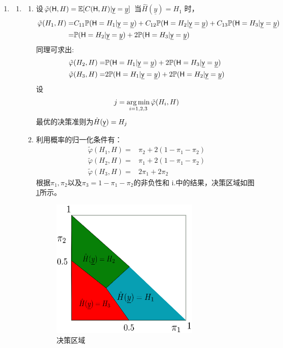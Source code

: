 \documentclass[a4paper]{article}
\begin{document}
\begin{enumerate}[label=\thehwcnt.\arabic*.]
\begin{enumerate}[label=(\alph*)]
    \end{enumerate}
  \item 
  \begin{enumerate}[label=(\alph*)]
  \item
    \begin{enumerate}[label=\roman*.]
    \item 设$\tilde{\varphi}(\mathsf{H},H)=\operatorname{\mathbb{E}}[C(\mathsf{H},H)|\underline{\mathsf{y}}=\underline{y}]$
    当$\hat{H}(\underline{y})=H_1$ 时，
    \begin{align*}
    \tilde{\varphi}(H_1,H) =& C_{11}\mathbb{P}(\mathsf{H}=H_1 | \underline{\mathsf{y}}=\underline{y})+
    C_{12}\mathbb{P}(\mathsf{H}=H_2 | \underline{\mathsf{y}}=\underline{y})+C_{13}\mathbb{P}(\mathsf{H}=H_3 | \underline{\mathsf{y}}=\underline{y})\\
    =& \mathbb{P}(\mathsf{H}=H_2 | \underline{\mathsf{y}}=\underline{y})+2\mathbb{P}(\mathsf{H}=H_3 | \underline{\mathsf{y}}=\underline{y})
    \end{align*}
    同理可求出:
    \begin{align*}
    \tilde{\varphi}(H_2,H) =&\mathbb{P}(\mathsf{H}=H_1 | \underline{\mathsf{y}}=\underline{y})+2\mathbb{P}(\mathsf{H}=H_3 | \underline{\mathsf{y}}=\underline{y})\\
    \tilde{\varphi}(H_3,H) =&2\mathbb{P}(\mathsf{H}=H_1 | \underline{\mathsf{y}}=\underline{y})+2\mathbb{P}(\mathsf{H}=H_2 | \underline{\mathsf{y}}=\underline{y})
    \end{align*}
    设
    \[    
    j=\operatorname*{arg\,min}_{i=1,2,3} \tilde{\varphi}(H_i,H)
    \]
    最优的决策准则为$\hat{H}(\underline{\mathsf{y}})=H_j$
    \item
    利用概率的归一化条件有：
    \begin{align*}
    \tilde{\varphi}(H_1,H) =&\pi_2+2(1-\pi_1-\pi_2)\\    
    \tilde{\varphi}(H_2,H) =&\pi_1+2(1-\pi_1-\pi_2)\\    
    \tilde{\varphi}(H_3,H) =&2\pi_1+2\pi_2
    \end{align*}
    根据$\pi_1,\pi_2$以及$\pi_3=1-\pi_1-\pi_2$的非负性和
    i.中的结果，决策区域如图\ref{fig:c3f1}所示。
    \begin{figure}[!ht]
    \centering
    \includegraphics[width=7cm]{c3f1.eps}
    \caption{决策区域}\label{fig:c3f1}
    \end{figure}
    

\end{enumerate}
\end{enumerate}
\end{enumerate}
\end{document}
